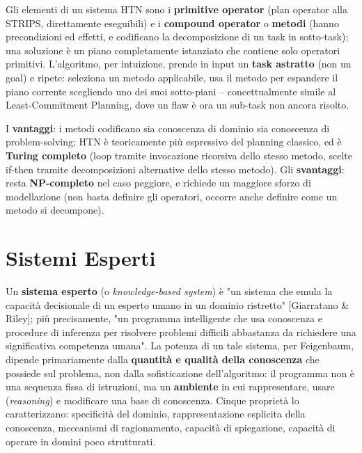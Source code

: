 \documentclass[a4paper,11pt]{article}
\begin{document}
Gli elementi di un sistema HTN sono i \textbf{primitive operator} (plan operator alla STRIPS, direttamente eseguibili) e i \textbf{compound operator} o \textbf{metodi} (hanno precondizioni ed effetti, e codificano la decomposizione di un task in sotto-task); una soluzione è un piano completamente istanziato che contiene solo operatori primitivi. L'algoritmo, per intuizione, prende in input un \textbf{task astratto} (non un goal) e ripete: seleziona un metodo applicabile, usa il metodo per espandere il piano corrente scegliendo uno dei suoi sotto-piani -- concettualmente simile al Least-Commitment Planning, dove un flaw è ora un sub-task non ancora risolto.

I \textbf{vantaggi}: i metodi codificano sia conoscenza di dominio sia conoscenza di problem-solving; HTN è teoricamente più espressivo del planning classico, ed è \textbf{Turing completo} (loop tramite invocazione ricorsiva dello stesso metodo, scelte if-then tramite decomposizioni alternative dello stesso metodo). Gli \textbf{svantaggi}: resta \textbf{NP-completo} nel caso peggiore, e richiede un maggiore sforzo di modellazione (non basta definire gli operatori, occorre anche definire come un metodo si decompone).

\newpage
\section{Sistemi Esperti}

Un \textbf{sistema esperto} (o \emph{knowledge-based system}) è "un sistema che emula la capacità decisionale di un esperto umano in un dominio ristretto" [Giarratano \& Riley]; più precisamente, "un programma intelligente che usa conoscenza e procedure di inferenza per risolvere problemi difficili abbastanza da richiedere una significativa competenza umana". La potenza di un tale sistema, per Feigenbaum, dipende primariamente dalla \textbf{quantità e qualità della conoscenza} che possiede sul problema, non dalla sofisticazione dell'algoritmo: il programma non è una sequenza fissa di istruzioni, ma un \textbf{ambiente} in cui rappresentare, usare (\emph{reasoning}) e modificare una base di conoscenza. Cinque proprietà lo caratterizzano: specificità del dominio, rappresentazione esplicita della conoscenza, meccanismi di ragionamento, capacità di spiegazione, capacità di operare in domini poco strutturati.
\end{document}
